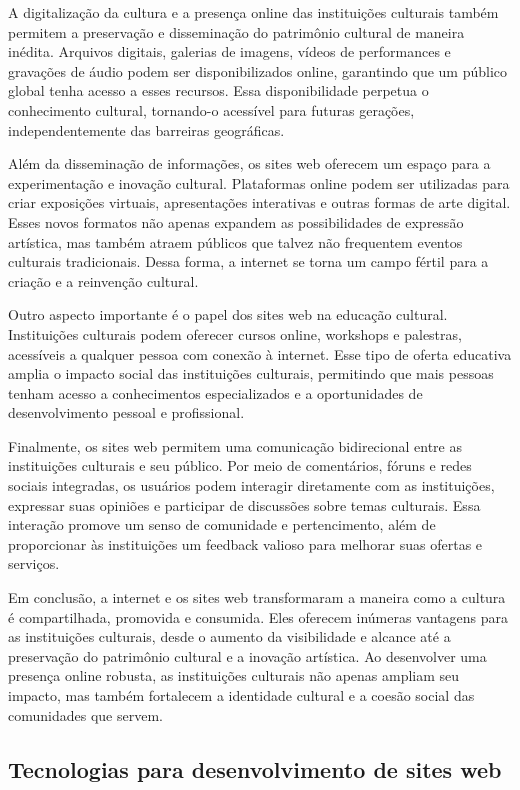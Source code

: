 A digitalização da cultura e a presença online das instituições culturais também permitem a preservação e disseminação do patrimônio cultural de maneira inédita. Arquivos digitais, galerias de imagens, vídeos de performances e gravações de áudio podem ser disponibilizados online, garantindo que um público global tenha acesso a esses recursos. Essa disponibilidade perpetua o conhecimento cultural, tornando-o acessível para futuras gerações, independentemente das barreiras geográficas.

Além da disseminação de informações, os sites web oferecem um espaço para a experimentação e inovação cultural. Plataformas online podem ser utilizadas para criar exposições virtuais, apresentações interativas e outras formas de arte digital. Esses novos formatos não apenas expandem as possibilidades de expressão artística, mas também atraem públicos que talvez não frequentem eventos culturais tradicionais. Dessa forma, a internet se torna um campo fértil para a criação e a reinvenção cultural.

Outro aspecto importante é o papel dos sites web na educação cultural. Instituições culturais podem oferecer cursos online, workshops e palestras, acessíveis a qualquer pessoa com conexão à internet. Esse tipo de oferta educativa amplia o impacto social das instituições culturais, permitindo que mais pessoas tenham acesso a conhecimentos especializados e a oportunidades de desenvolvimento pessoal e profissional.

Finalmente, os sites web permitem uma comunicação bidirecional entre as instituições culturais e seu público. Por meio de comentários, fóruns e redes sociais integradas, os usuários podem interagir diretamente com as instituições, expressar suas opiniões e participar de discussões sobre temas culturais. Essa interação promove um senso de comunidade e pertencimento, além de proporcionar às instituições um feedback valioso para melhorar suas ofertas e serviços.

Em conclusão, a internet e os sites web transformaram a maneira como a cultura é compartilhada, promovida e consumida. Eles oferecem inúmeras vantagens para as instituições culturais, desde o aumento da visibilidade e alcance até a preservação do patrimônio cultural e a inovação artística. Ao desenvolver uma presença online robusta, as instituições culturais não apenas ampliam seu impacto, mas também fortalecem a identidade cultural e a coesão social das comunidades que servem.

\subsection{Tecnologias para desenvolvimento de sites web}

